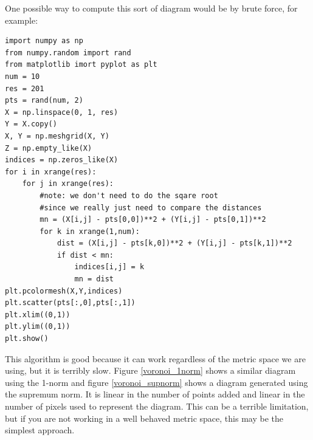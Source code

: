 One possible way to compute this sort of diagram would be by brute force, for example:
\begin{lstlisting}
import numpy as np
from numpy.random import rand
from matplotlib imort pyplot as plt
num = 10
res = 201
pts = rand(num, 2)
X = np.linspace(0, 1, res)
Y = X.copy()
X, Y = np.meshgrid(X, Y)
Z = np.empty_like(X)
indices = np.zeros_like(X)
for i in xrange(res):
    for j in xrange(res):
        #note: we don't need to do the sqare root
        #since we really just need to compare the distances
        mn = (X[i,j] - pts[0,0])**2 + (Y[i,j] - pts[0,1])**2
        for k in xrange(1,num):
            dist = (X[i,j] - pts[k,0])**2 + (Y[i,j] - pts[k,1])**2
            if dist < mn:
                indices[i,j] = k
                mn = dist
plt.pcolormesh(X,Y,indices)
plt.scatter(pts[:,0],pts[:,1])
plt.xlim((0,1))
plt.ylim((0,1))
plt.show()
\end{lstlisting}
This algorithm is good because it can work regardless of the metric space we are using, but it is terribly slow.
Figure \ref{voronoi_1norm} shows a similar diagram using the 1-norm and figure \ref{voronoi_supnorm} shows a diagram generated using the supremum norm.
It is linear in the number of points added and linear in the number of pixels used to represent the diagram.
This can be a terrible limitation, but if you are not working in a well behaved metric space, this may be the simplest approach.
